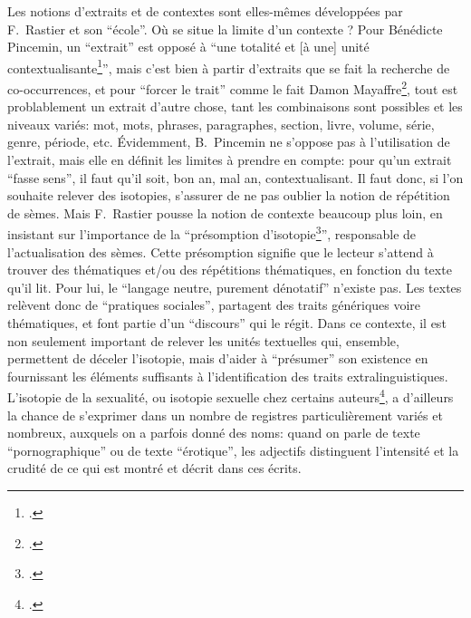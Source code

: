 Les notions d'extraits et de contextes sont elles-mêmes développées par F.~Rastier et son \enquote{école}. Où se situe la limite d'un contexte ? Pour Bénédicte Pincemin, un \enquote{extrait} est opposé à \enquote{une totalité et [à une] unité contextualisante\footcite{pincemin1999semantique}}, mais c'est bien à partir d'extraits que se fait la recherche de co-occurrences, et pour \enquote{forcer le trait} comme le fait Damon Mayaffre\footcite{mayaffre2008occurrence}, tout est problablement un extrait d'autre chose, tant les combinaisons sont possibles et les niveaux variés: mot, mots, phrases, paragraphes, section, livre, volume, série, genre, période, etc. Évidemment, B.~Pincemin ne s'oppose pas à l'utilisation de l'extrait, mais elle en définit les limites à prendre en compte: pour qu'un extrait \enquote{fasse sens}, il faut qu'il soit, bon an, mal an, contextualisant. Il faut donc, si l'on souhaite relever des isotopies, s'assurer de ne pas oublier la notion de répétition de sèmes. Mais F.~Rastier pousse la notion de contexte beaucoup plus loin, en insistant sur l'importance de la \enquote{présomption d'isotopie\footcite{rastier_isotopie_1985}}, responsable de l'actualisation des sèmes. Cette présomption signifie que le lecteur s'attend à trouver des thématiques et/ou des répétitions thématiques, en fonction du texte qu'il lit. Pour lui, le \enquote{langage neutre, purement dénotatif} n'existe pas. Les textes relèvent donc de \enquote{pratiques sociales}, partagent des traits génériques voire thématiques, et font partie d'un \enquote{discours} qui le régit. Dans ce contexte, il est non seulement important de relever les unités textuelles qui, ensemble, permettent de déceler l'isotopie, mais d'aider à \enquote{présumer} son existence en fournissant les éléments suffisants à l'identification des traits extralinguistiques.  L'isotopie de la sexualité, ou isotopie sexuelle chez certains auteurs\footcite{leon_semes_1976}, a d'ailleurs la chance de s'exprimer dans un nombre de registres particulièrement variés et nombreux, auxquels on a parfois donné des noms: quand on parle de texte \enquote{pornographique} ou de texte \enquote{érotique}, les adjectifs distinguent l'intensité et la crudité de ce qui est montré et décrit dans ces écrits.

